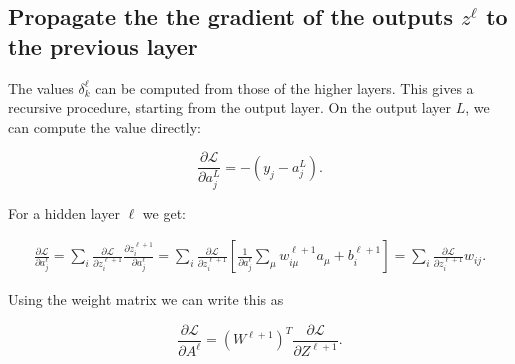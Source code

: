 \documentclass[a4paper,10pt]{article}
\def\Loss{\mathcal{L}}
\begin{document}
\subsection{Propagate the the gradient of the outputs $z^\ell$ to the previous layer}

The values $\delta_k^\ell$ can be computed from those of the higher layers.
This gives a recursive procedure, starting from the output layer. On the output
layer $L$, we can compute the value directly:

\[
    \frac{\partial \Loss}{\partial a_j^L} = - (y_j - a_j^L).
\]

For a hidden layer $\ell$ we get:

\begin{align*}
    \frac{\partial \Loss}{\partial a_j^\ell} 
    = \sum_{i} \frac{\partial \Loss}{\partial z_i^{\ell +1}} \frac{\partial z_i^{\ell +1}}{\partial a_j^\ell} 
    = \sum_{i} \frac{\partial \Loss}{\partial z_i^{\ell +1}} \left[  \frac{1}{\partial a_j^\ell} \sum_{\mu} w_{i\mu}^{\ell +1} a_\mu + b_i^{\ell +1} \right] 
    = \sum_{i} \frac{\partial \Loss}{\partial z_i^{\ell +1}} w_{ij}.
\end{align*}

Using the weight matrix we can write this as

\begin{equation}
    \boxed{
    \frac{\partial \Loss}{\partial A^\ell} = (W^{\ell +1})^T \frac{\partial \Loss}{\partial Z^{\ell + 1}}.
    }
\end{equation}
\end{document}
